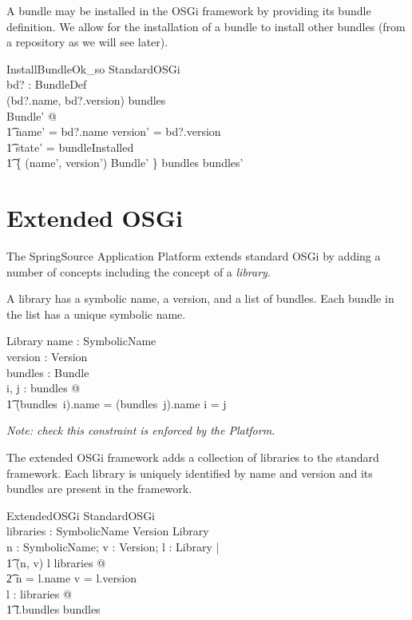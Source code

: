\documentclass[a4paper]{article}
\begin{document}
A bundle may be installed in the OSGi framework by providing its bundle definition.
We allow for the installation of a bundle to install other bundles (from a repository
as we will see later).
\begin{schema}{InstallBundleOk\_so}
 \Delta StandardOSGi \\
 bd? : BundleDef \\
\where
 (bd?.name, bd?.version) \notin \dom bundles \\
 \exists Bundle' @ \\
\t1 name' = bd?.name \land version' = bd?.version \land \\
\t1 state' = bundleInstalled \land \\
\t1 \{ (name', version') \mapsto \theta Bundle' \} \cup bundles \subseteq bundles' \\
\end{schema}

\clearpage
\section{Extended OSGi}
\label{cha:extendedosgi}

The SpringSource Application Platform extends standard OSGi by adding a number of concepts
including the concept of a \textit{library}.

A library has a symbolic name, a version, and a list of bundles. Each bundle
in the list has a unique symbolic name.
\begin{schema}{Library}
 name : SymbolicName \\
 version : Version \\
 bundles : \seq Bundle \\
\where
 \forall i, j : \dom bundles @ \\
\t1 (bundles~i).name = (bundles~j).name \implies i = j \\
\end{schema}
\textit{Note: check this constraint is enforced by the Platform.}

The extended OSGi framework adds a collection of libraries to the standard framework.
Each library is uniquely identified by name and version and its bundles are present in
the framework.
\begin{schema}{ExtendedOSGi}
 StandardOSGi \\
 libraries : SymbolicName \cross Version \pinj Library \\
\where
 \forall n : SymbolicName; v : Version; l : Library | \\
\t1 (n, v) \mapsto l \in libraries @ \\
\t2 n = l.name \land v = l.version \\
 \forall l : \ran libraries @ \\
\t1 \ran l.bundles \subseteq \ran bundles \\
\end{schema}
\end{document}
